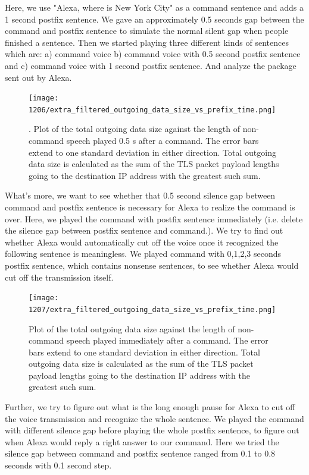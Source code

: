 Here, we use "Alexa, where is New York City" as a command sentence and adds a 1 second postfix sentence. We gave an approximately 0.5 seconds gap between the command and postfix sentence to simulate the normal silent gap when people finished a sentence. Then we started playing three different kinds of sentences which are: a) command voice b) command voice with 0.5 second postfix sentence and c) command voice with 1 second postfix sentence. And analyze the package sent out by Alexa.

\begin{figure}[]
    \centering
    \texttt{[image: 1206/extra\_filtered\_outgoing\_data\_size\_vs\_prefix\_time.png]}
    \caption{. Plot of the total outgoing data size against the length of non-command speech played 0.5 s after a command. The error bars extend to one standard deviation in either direction. Total outgoing data size is calculated as the sum of the TLS packet payload lengths going to the destination IP address with the greatest such sum.}
    \label{fig:postfix_gap}
\end{figure}



What's more, we want to see whether that 0.5 second silence gap between command and postfix sentence is necessary for Alexa to realize the command is over. Here, we played the command with postfix sentence immediately (i.e. delete the silence gap between postfix sentence and command.). We try to find out whether Alexa would automatically cut off the voice once it recognized the following sentence is meaningless. We played command with 0,1,2,3 seconds postfix sentence, which contains nonsense sentences, to see whether Alexa would cut off the transmission itself.


\begin{figure}[]
    \centering
    \texttt{[image: 1207/extra\_filtered\_outgoing\_data\_size\_vs\_prefix\_time.png]}
    \caption{Plot of the total outgoing data size against the length of non-command speech played immediately after a command. The error bars extend to one standard deviation in either direction. Total outgoing data size is calculated as the sum of the TLS packet payload lengths going to the destination IP address with the greatest such sum.}
    \label{fig:postfix_nogap}
\end{figure}

Further, we try to figure out what is the long enough pause for Alexa to cut off the voice transmission and recognize the whole sentence. We played the command with different silence gap before playing the whole postfix sentence, to figure out when Alexa would reply a right answer to our command. Here we tried the silence gap between command and postfix sentence ranged from 0.1 to 0.8 seconds with 0.1 second step.

